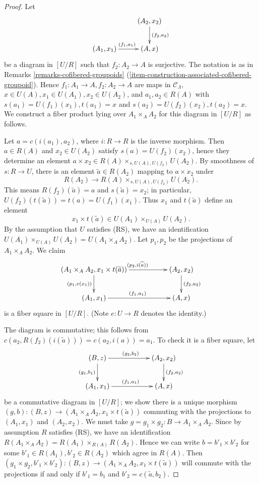\begin{proof}
Let 
\[
\xymatrix{
                           &     (A_2,x_2) \ar[d]^{(f_2,a_2)} \\
(A_1,x_1) \ar[r]^{(f_1,a_1)} &     (A,x)
}
\]
be a diagram in $[U/R]$ such that $f_2: A_2 \rightarrow A$ is surjective. The 
notation is as in Remarks \ref{remarks-cofibered-groupoids} 
(\ref{item-construction-associated-cofibered-groupoid}).
Hence $f_1: A_1 \rightarrow A, f_2: A_2 \rightarrow A$
are maps in $\mathcal C_{\Lambda}$, $x \in U(A), x_1 
\in U(A_1), x_2 \in U(A_2)$, and $a_1,a_2 \in R(A)$ with $s(a_1) = U(f_1)(x_1), 
t(a_1) = x$ and $s(a_2) = U(f_2)(x_2), t(a_2) = x$. We construct a fiber 
product lying over $A_1 \times_{A} A_2$ for this diagram in $[U/R]$ as follows. 

\medskip \noindent 
Let $a = c(i(a_1),a_2)$, where $i: R \rightarrow R$ is the inverse morphism. 
Then $a \in R(A)$ and $x_2 \in U(A_2)$ satisfy $s(a) = U(f_2)(x_2)$, hence they 
determine an element $a \times x_2 \in R(A) \times_{s,U(A),U(f_2)} U(A_2)$. By 
smoothness of $s: R \rightarrow U$, there is an element $\widetilde{a} \in 
R(A_2)$ mapping to $a \times x_2$ under
\[ R(A_2) \rightarrow R(A) \times_{s,U(A),U(f_2)} U(A_2). \]
This means $R(f_2)(\widetilde{a}) = a$ and $s(\widetilde{a}) = x_2$; in 
particular, $U(f_2)(t(\widetilde{a})) = t(a) = U(f_1)(x_1)$. Thus $x_1$ and 
$t(\widetilde{a})$ define an element 
\[ x_1 \times t(\widetilde{a}) \in U(A_1) \times_{U(A)} U(A_2).\]
By the assumption that $U$ satisfies (RS), we have an identification $U(A_1) 
\times_{U(A)} U(A_2) = U(A_1 \times_{A} A_2)$.  Let $p_1,p_2$ be the 
projections of $A_1 \times_{A} A_2$.  We claim 
\[ 
\xymatrix{
(A_1 \times_{A} A_2, x_1 \times t(\widetilde{a})) \ar[d]_{(p_1, e(x_1))} 
\ar[rr]^{(p_2, i(\widetilde{a}))} & & (A_2, x_2) \ar[d]^{(f_2,a_2)} \\
(A_1, x_1) \ar[rr]^{(f_1,a_1)} && (A,x) 
}
\]
is a fiber square in $[U/R]$. (Note $e: U \rightarrow R$ denotes the identity.)

\medskip \noindent
The diagram is commutative; this follows from $c(a_2,R(f_2)(i(\widetilde{a}))) 
= c(a_2, i(a)) = a_1$. To check it is a fiber square, let
\[ 
\xymatrix{
(B, z) \ar[d]_{(g_1, b_1)} \ar[rr]^{(g_2, b_2)} & & (A_2, x_2) 
\ar[d]^{(f_2,a_2)} \\
(A_1, x_1) \ar[rr]^{(f_1,a_1)} && (A,x) 
}
\]
be a commutative diagram in $[U/R]$; we show there is a unique morphism $(g,b): 
(B, z) \rightarrow (A_1 \times_{A} A_2, x_1 \times t(\widetilde{a}))$ commuting 
with the projections to $(A_1,x_1)$ and $(A_2,x_2)$. We must take $g = g_1 
\times g_2: B \rightarrow A_1 \times_{A} A_2$.  Since by assumption $R$ 
satisfies (RS), we have an identification $R(A_1 \times_{A} A_2) = R(A_1) 
\times_{R(A)} R(A_2)$.  Hence we can write $b = b'_1 \times b'_2$ for some 
$b'_1 \in R(A_1), b'_2 \in R(A_2)$ which agree in $R(A)$. Then $(g_1 \times 
g_2, b'_1 \times b'_2): (B, z) \rightarrow (A_1 \times_{A} A_2, x_1 \times 
t(\widetilde{a}))$ will commute with the projections if and only if $b'_1 = 
b_1$ and $b'_2 = c(\widetilde{a}, b_2)$.
\end{proof}

